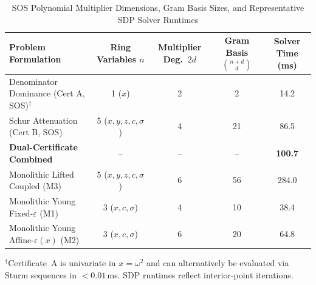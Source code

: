 \begin{table}[t]
\centering
\caption{SOS Polynomial Multiplier Dimensions, Gram Basis Sizes, and Representative SDP Solver Runtimes}
\label{tab:sos_feasibility}
\begin{tabular}{lcccc}
\toprule
Problem Formulation & Ring Variables $n$ & Multiplier Deg.\ $2d$ & Gram Basis $\binom{n+d}{d}$ & Solver Time (ms) \\
\midrule
Denominator Dominance (Cert A, SOS)$^\dagger$ & 1 ($x$) & 2 & 2 & 14.2 \\
Schur Attenuation (Cert B, SOS) & 5 ($x,y,z,c,\sigma$) & 4 & 21 & 86.5 \\
\textbf{Dual-Certificate Combined} & -- & -- & -- & \textbf{100.7} \\
\midrule
Monolithic Lifted Coupled (M3) & 5 ($x,y,z,c,\sigma$) & 6 & 56 & 284.0 \\
Monolithic Young Fixed-$\varepsilon$ (M1) & 3 ($x,c,\sigma$) & 4 & 10 & 38.4 \\
Monolithic Young Affine-$\varepsilon(x)$ (M2) & 3 ($x,c,\sigma$) & 6 & 20 & 64.8 \\
\bottomrule
\end{tabular}
\vspace{1ex}
\raggedright\footnotesize $^\dagger$Certificate~A is univariate in $x=\omega^2$ and can alternatively be evaluated via Sturm sequences in $<0.01$\,ms. SDP runtimes reflect interior-point iterations.
\end{table}
